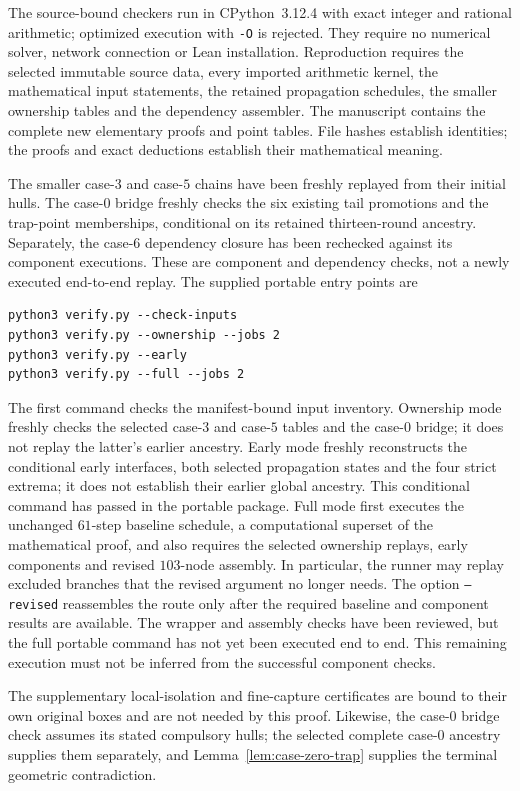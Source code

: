 \documentclass[11pt]{article}
\begin{document}
The source-bound checkers run in CPython~3.12.4 with exact integer and
rational arithmetic; optimized execution with \texttt{-O} is rejected.
They require no numerical solver, network connection or Lean installation.
Reproduction requires the selected immutable source data, every imported
arithmetic kernel, the mathematical input statements, the retained
propagation schedules, the smaller ownership tables and the dependency
assembler. The manuscript contains the complete new elementary proofs
and point tables. File hashes establish identities; the proofs
and exact deductions establish their mathematical meaning.

The smaller case-$3$ and case-$5$ chains have been freshly replayed from
their initial hulls. The case-$0$ bridge freshly checks the six existing
tail promotions and the trap-point memberships, conditional on its
retained thirteen-round ancestry. Separately, the case-$6$ dependency
closure has been rechecked against its component executions. These are
component and dependency checks, not a newly executed end-to-end replay.
The supplied portable entry points are
\begin{verbatim}
python3 verify.py --check-inputs
python3 verify.py --ownership --jobs 2
python3 verify.py --early
python3 verify.py --full --jobs 2
\end{verbatim}
The first command checks the manifest-bound input inventory. Ownership
mode freshly checks the selected case-$3$ and case-$5$ tables and the
case-$0$ bridge; it does not replay the latter's earlier ancestry.
Early mode freshly reconstructs the conditional early interfaces, both selected
propagation states and the four strict extrema; it does not establish
their earlier global ancestry. This conditional command has passed in
the portable package. Full mode first executes the unchanged $61$-step
baseline schedule, a computational superset of the mathematical proof,
and also requires the selected ownership replays, early components and
revised $103$-node assembly. In
particular, the runner may replay excluded branches that the revised
argument no longer needs. The option \texttt{--revised} reassembles the
route only after the required baseline and component results are available. The
wrapper and assembly checks have been reviewed, but the full portable
command has not yet been executed end to end. This remaining execution
must not be inferred from the successful component checks.

The supplementary local-isolation and fine-capture certificates are
bound to their own original boxes and are not needed by this proof.
Likewise, the case-$0$ bridge check assumes its stated compulsory hulls;
the selected complete case-$0$ ancestry supplies them separately, and
Lemma~\ref{lem:case-zero-trap} supplies the terminal geometric contradiction.
\end{document}
